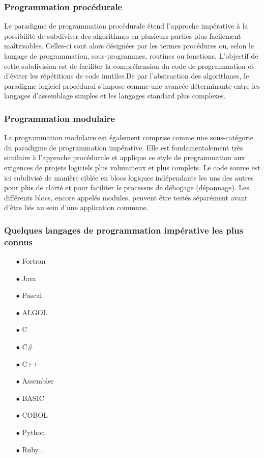 \documentclass[a4paper,12pt]{article} %
\begin{document}
\subsubsection{Programmation procédurale}

Le paradigme de programmation procédurale étend l’approche impérative à la possibilité de subdiviser des algorithmes en plusieurs parties plus facilement maîtrisables. Celles-ci sont alors désignées par les termes procédures ou, selon le langage de programmation, sous-programmes, routines ou fonctions. L’objectif de cette subdivision est de faciliter la compréhension du code de programmation et d’éviter les répétitions de code inutiles.De par l’abstraction des algorithmes, le paradigme logiciel procédural s’impose comme une avancée déterminante entre les langages d’assemblage simples et les langages standard plus complexes.

\subsubsection{Programmation modulaire}

La programmation modulaire est également comprise comme une sous-catégorie du paradigme de programmation impérative. Elle est fondamentalement très similaire à l’approche procédurale et applique ce style de programmation aux exigences de projets logiciels plus volumineux et plus complets. Le code source est ici subdivisé de manière ciblée en blocs logiques indépendants les uns des autres pour plus de clarté et pour faciliter le processus de débogage (dépannage). Les différents blocs, encore appelés modules, peuvent être testés séparément avant d’être liés au sein d’une application commune.

\subsubsection{Quelques langages de programmation impérative les plus connus }
\begin{itemize}
\item[$\bullet$]Fortran
\item[$\bullet$]Java
\item[$\bullet$]Pascal
\item[$\bullet$]ALGOL
\item[$\bullet$]C
\item[$\bullet$]C# 
\item[$\bullet$]C++
\item[$\bullet$]Assembler
\item[$\bullet$]BASIC
\item[$\bullet$]COBOL
\item[$\bullet$]Python
\item[$\bullet$]Ruby...
\end{itemize}
\end{document}
